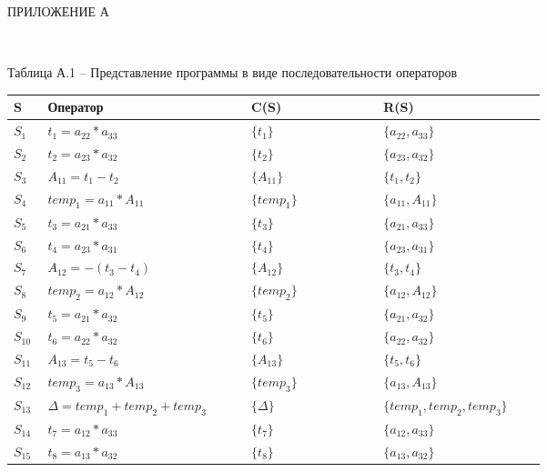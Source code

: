 \documentclass[a4paper,14pt]{article}
\begin{document}
    \begin{center} ПРИЛОЖЕНИЕ А \end{center}\\ \vspace{5mm}

Таблица А.1 – Представление программы в виде последовательности операторов\\
            \setlength{\tabcolsep}{15pt}
            \renewcommand{\arraystretch}{1.5}

            \begin{tabular}{|p{0.03\linewidth}|p{0.25\linewidth}|p{0.2\linewidth}|p{0.2\linewidth}|}
                \hline
                S & Оператор & C(S) & R(S) \\ \hline
                $S_{1}$ &$t_{1} = a_{22}*a_{33}$ &$\{t_{1}\}$ &$\{a_{22}, a_{33}\}$ \\ \hline
$S_{2}$ &$t_{2} = a_{23}*a_{32}$ &$\{t_{2}\}$ &$\{a_{23}, a_{32}\}$ \\ \hline
$S_{3}$ &$A_{11} = t_{1} - t_{2}$ &$\{A_{11}\}$ &$\{t_{1}, t_{2}\}$ \\ \hline
$S_{4}$ &$temp_{1} = a_{11}*A_{11}$ &$\{temp_{1}\}$ &$\{a_{11}, A_{11}\}$ \\ \hline
$S_{5}$ &$t_{3} = a_{21}*a_{33}$ &$\{t_{3}\}$ &$\{a_{21}, a_{33}\}$ \\ \hline
$S_{6}$ &$t_{4} = a_{23}*a_{31}$ &$\{t_{4}\}$ &$\{a_{23}, a_{31}\}$ \\ \hline
$S_{7}$ &$A_{12} = -(t_{3} - t_{4})$ &$\{A_{12}\}$ &$\{t_{3}, t_{4}\}$ \\ \hline
$S_{8}$ &$temp_{2} = a_{12}*A_{12}$ &$\{temp_{2}\}$ &$\{a_{12}, A_{12}\}$ \\ \hline
$S_{9}$ &$t_{5} = a_{21}*a_{32}$ &$\{t_{5}\}$ &$\{a_{21}, a_{32}\}$ \\ \hline
$S_{10}$ &$t_{6} = a_{22}*a_{32}$ &$\{t_{6}\}$ &$\{a_{22}, a_{32}\}$ \\ \hline
$S_{11}$ &$A_{13} = t_{5} - t_{6}$ &$\{A_{13}\}$ &$\{t_{5}, t_{6}\}$ \\ \hline
$S_{12}$ &$temp_{3} = a_{13}*A_{13}$ &$\{temp_{3}\}$ &$\{a_{13}, A_{13}\}$ \\ \hline
$S_{13}$ &$\Delta = temp_{1} + temp_{2} + temp_{3}$ &$\{\Delta\}$ &$\{temp_{1}, temp_{2}, temp_{3}\}$ \\ \hline
$S_{14}$ &$t_{7} = a_{12}*a_{33}$ &$\{t_{7}\}$ &$\{a_{12}, a_{33}\}$ \\ \hline
$S_{15}$ &$t_{8} = a_{13}*a_{32}$ &$\{t_{8}\}$ &$\{a_{13}, a_{32}\}$ \\ \hline

\end{tabular}
\end{document}
